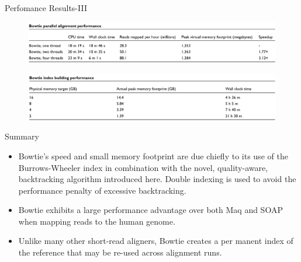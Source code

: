 \documentclass[mathserif]{beamer}
\begin{document}
\begin{frame}{Perfomance Results-III}
    \begin{figure}
        \includegraphics[width=\textwidth]{media/tab4.png}
    \end{figure}
    \pause
    \begin{figure}
        \includegraphics[width=\textwidth]{media/tab5.png}
    \end{figure}
\end{frame}

\begin{frame}{Summary}
    \begin{itemize}
        \item Bowtie's speed and small memory footprint are due chiefly to
        its use of the Burrows-Wheeler index in combination with the
        novel, quality-aware, backtracking algorithm introduced
        here. Double indexing is used to avoid the performance penalty
        of excessive backtracking.
        \item Bowtie exhibits a large performance advantage over both Maq
        and SOAP when mapping reads to the human genome.
        \item  Unlike many other short-read aligners, Bowtie creates a per
        manent index of the reference that may be re-used across
        alignment runs. 
    \end{itemize}
\end{frame}
\end{document}
